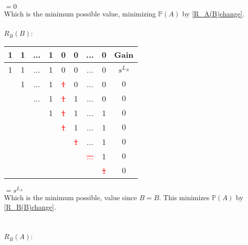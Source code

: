 \documentclass[english,12pt,a4paper,final]{article}
\begin{document}
$=0$
\\
Which is the minimum possible value, minimizing $\mathbb{P}(A)$ by \eqref{R_A(B)change}.
\\\\
${R_B(B)}$:
\begin{tabular}{|cccccccc|c|}
	\hline
	1 & 1 & ... & 1 & 0 & 0 & ... & 0 & Gain \\
	\hline
	
	\textcolor{OliveGreen}{1} & \textcolor{OliveGreen}{1} & \textcolor{OliveGreen}{...} & \textcolor{OliveGreen}{1} & \textcolor{OliveGreen}{0} & \textcolor{OliveGreen}{0} & \textcolor{OliveGreen}{...} & \textcolor{OliveGreen}{0} & $s^{L_A}$\\
	
	& \textcolor{OliveGreen}{1} & \textcolor{OliveGreen}{...} & \textcolor{OliveGreen}{1} & \textcolor{red}{\sout{1}} & 0 & ... & 0 & $0$ \\
	
	&  & \textcolor{OliveGreen}{...} & \textcolor{OliveGreen}{1} & \textcolor{red}{\sout{1}} & 1 & ... & 0 & $0$ \\
	
	&  &  & \textcolor{OliveGreen}{1} & \textcolor{red}{\sout{1}} & 1 & ... & 1 & $0$ \\
	
	&  &  &  & \textcolor{red}{\sout{1}} & 1 & ... & 1 & $0$ \\
	
	&  &  &  &  & \textcolor{red}{\sout{1}} & ... & 1 & $0$ \\
	
	&  &  &  &  &  & \textcolor{red}{\sout{...}} & 1 & $0$ \\
	
	&  &  &  &  &  &  & \textcolor{red}{\sout{1}} & $0$ \\
	\hline
\end{tabular}
$=s^{L_A}$
\\
Which is the minimum possible, value since $B=B$. This minimizes $\mathbb{P}(A)$ by \eqref{R_B(B)change}.
\\\\\\
${R_B(A)}$:
\end{document}
